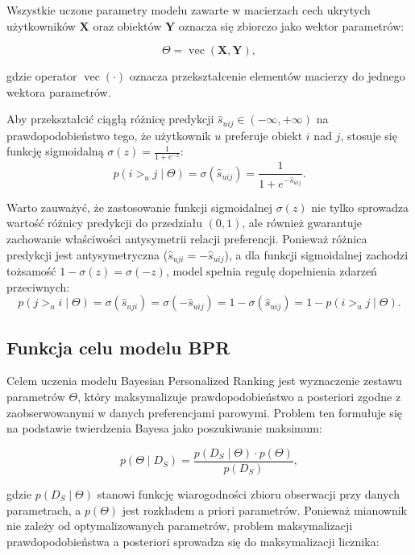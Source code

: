 Wszystkie uczone parametry modelu zawarte w macierzach cech ukrytych użytkowników $\mathbf{X}$ oraz obiektów $\mathbf{Y}$ oznacza się zbiorczo jako wektor parametrów:

\begin{equation}
    \Theta =
    \operatorname{vec}(\mathbf{X},\mathbf{Y}),
\end{equation}

gdzie operator $\operatorname{vec}(\cdot)$ oznacza przekształcenie elementów macierzy do jednego wektora parametrów.

Aby przekształcić ciągłą różnicę predykcji $\hat{s}_{uij} \in (-\infty, +\infty)$ na prawdopodobieństwo tego, że użytkownik $u$ preferuje obiekt $i$ nad $j$, stosuje się funkcję sigmoidalną $\sigma(z) = \frac{1}{1 + e^{-z}}$:
\begin{equation}
    p(i >_u j \mid \Theta) = \sigma(\hat{s}_{uij}) = \frac{1}{1 + e^{-\hat{s}_{uij}}}.
\end{equation}

Warto zauważyć, że zastosowanie funkcji sigmoidalnej $\sigma(z)$ nie tylko sprowadza wartość różnicy predykcji do przedziału $(0, 1)$, ale również gwarantuje zachowanie właściwości antysymetrii relacji preferencji. Ponieważ różnica predykcji jest antysymetryczna ($\hat{s}_{uji} = -\hat{s}_{uij}$), a dla funkcji sigmoidalnej zachodzi tożsamość $1 - \sigma(z) = \sigma(-z)$, model spełnia regułę dopełnienia zdarzeń przeciwnych:
\begin{equation}
    p(j >_u i \mid \Theta) = \sigma(\hat{s}_{uji}) = \sigma(-\hat{s}_{uij}) = 1 - \sigma(\hat{s}_{uij}) = 1 - p(i >_u j \mid \Theta).
\end{equation}

\subsection{Funkcja celu modelu BPR}

Celem uczenia modelu Bayesian Personalized Ranking jest wyznaczenie zestawu parametrów $\Theta$, który maksymalizuje prawdopodobieństwo a posteriori zgodne z zaobserwowanymi w danych preferencjami parowymi. Problem ten formułuje się na podstawie twierdzenia Bayesa jako poszukiwanie maksimum:

\begin{equation}
    p(\Theta \mid D_S) = \frac{p(D_S \mid \Theta) \cdot p(\Theta)}{p(D_S)},
\end{equation}

gdzie $p(D_S \mid \Theta)$ stanowi funkcję wiarogodności zbioru obserwacji przy danych parametrach, a $p(\Theta)$ jest rozkładem a priori parametrów. Ponieważ mianownik nie zależy od optymalizowanych parametrów, problem maksymalizacji prawdopodobieństwa a posteriori sprowadza się do maksymalizacji licznika:

